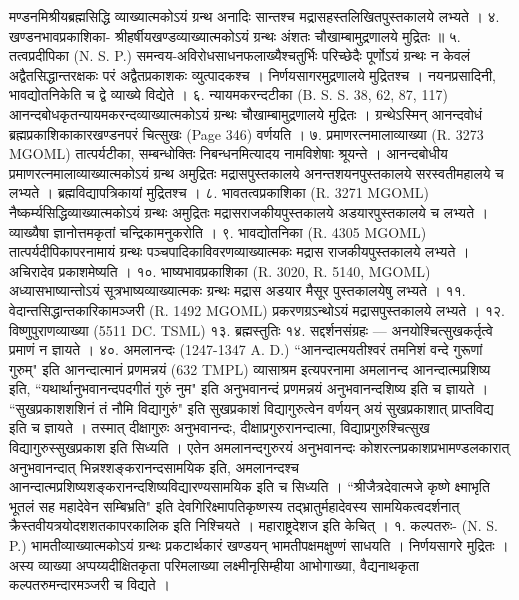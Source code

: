 मण्डनमिश्रीयब्रह्मसिद्धि व्याख्यात्मकोऽयं ग्रन्थ अनादिः सान्तश्च मद्रासहस्तलिखितपुस्तकालये लभ्यते ।
४. खण्डनभावप्रकाशिका-
श्रीहर्षीयखण्डव्याख्यात्मकोऽयं ग्रन्थः अंशतः चौखाम्बामुद्रणालये मुद्रितः ॥
५. तत्वप्रदीपिका (N. S. P.)
समन्वय-अविरोधसाधनफलाख्यैश्चतुर्भिः परिच्छेदैः पूर्णोऽयं ग्रन्थः न केवलं अद्वैतसिद्धान्तरक्षकः परं अद्वैतप्रकाशकः व्युत्पादकश्च । निर्णयसागरमुद्रणालये मुद्रितश्च । नयनप्रसादिनी, भावद्योतनिकेति च द्वे व्याख्ये विद्येते ।
६. न्यायमकरन्दटीका (B. S. S. 38, 62, 87, 117)
आनन्दबोधकृतन्यायमकरन्दव्याख्यात्मकोऽयं ग्रन्थः चौखाम्बामुद्रणालये मुद्रितः । ग्रन्थेऽस्मिन् आनन्दवोधं ब्रह्मप्रकाशिकाकारखण्डनपरं चित्सुखः (Page 346) वर्णयति ।
७. प्रमाणरत्नमालाव्याख्या (R. 3273 MGOML)
तात्पर्यटीका, सम्बन्धोक्तिः निबन्धनमित्यादय नामविशेषाः श्रूयन्ते । आनन्दबोधीय प्रमाणरत्नमालाव्याख्यात्मकोऽयं ग्रन्थ अमुद्रितः मद्रासपुस्तकालये अनन्तशयनपुस्तकालये सरस्वतीमहालये च लभ्यते । ब्रह्मविद्यापत्रिकायां मुद्रितश्च ।
८. भावतत्वप्रकाशिका (R. 3271 MGOML)
नैष्कर्म्यसिद्धिव्याख्यात्मकोऽयं ग्रन्थः अमुद्रितः मद्रासराजकीयपुस्तकालये अडयारपुस्तकालये च लभ्यते । व्याख्यैषा ज्ञानोत्तमकृतां चन्द्रिकामनुकरोति ।
९. भावद्योतनिका (R. 4305 MGOML)
तात्पर्यदीपिकापरनामायं ग्रन्थः पञ्चपादिकाविवरणव्याख्यात्मकः मद्रास राजकीयपुस्तकालये लभ्यते । अचिरादेव प्रकाशमेष्यति ।
१०. भाष्यभावप्रकाशिका (R. 3020, R. 5140, MGOML)
अध्यासभाष्यान्तोऽयं सूत्रभाष्यव्याख्यात्मकः ग्रन्थः मद्रास अडयार मैसूर पुस्तकालयेषु लभ्यते ।
११. वेदान्तसिद्धान्तकारिकामञ्जरी (R. 1492 MGOML) प्रकरणग्रऽन्थोऽयं मद्रासपुस्तकालये लभ्यते ।
१२. विष्णुपुराणव्याख्या (5511 DC. TSML)
१३. ब्रह्मस्तुतिः
१४. सद्दर्शनसंग्रहः --- अनयोश्चित्सुखकर्तृत्वे प्रमाणं न ज्ञायते ।
४०. अमलानन्दः (1247-1347 A. D.)
``आनन्दात्मयतीश्वरं तमनिशं वन्दे गुरूणां गुरुम्" इति आनन्दात्मानं प्रणमन्नयं (632 TMPL) व्यासाश्रम इत्यपरनामा अमलानन्द आनन्दात्मप्रशिष्य इति, ``यथार्थानुभवानन्दपदगीतं गुरुं नुम" इति अनुभवानन्दं प्रणमन्नयं अनुभवानन्दशिष्य इति च ज्ञायते । ``सुखप्रकाशशशिनं तं नौमि विद्यागुरुं" इति सुखप्रकाशं विद्यागुरुत्वेन वर्णयन् अयं सुखप्रकाशात् प्राप्तविद्य इति च ज्ञायते । तस्मात् दीक्षागुरुः अनुभवानन्दः, दीक्षाप्रगुरुरानन्दात्मा, विद्याप्रगुरुश्चित्सुख विद्यागुरुस्सुखप्रकाश इति सिध्यति । एतेन अमलानन्दगुरुरयं अनुभवानन्दः कोशरत्नप्रकाशप्रभामण्डलकारात् अनुभवानन्दात् भिन्नश्शङ्करानन्दसामयिक इति, अमलानन्दश्च आनन्दात्मप्रशिष्यशङ्करानन्दशिष्यविद्यारण्यसामयिक इति च सिध्यति ।
``श्रीजैत्रदेवात्मजे कृष्णे क्ष्माभृति भूतलं सह महादेवेन सम्बिभ्रति" इति देवगिरिक्ष्मापतिकृष्णस्य तद्भ्रातुर्महादेवस्य सामयिकत्वदर्शनात् क्रैस्तवीयत्रयोदशशतकापरकालिक इति निश्चियते । महाराष्ट्रदेशज इति केचित् ।
१. कल्पतरुः- (N. S. P.)
भामतीव्याख्यात्मकोऽयं ग्रन्थः प्रकटार्थकारं खण्डयन् भामतीपक्षमक्षुण्णं साधयति । निर्णयसागरे मुद्रितः । अस्य व्याख्या अप्पय्यदीक्षितकृता परिमलाख्या लक्ष्मीनृसिम्हीया आभोगाख्या, वैद्यनाथकृता कल्पतरुमन्दारमञ्जरी च विद्यते ।
